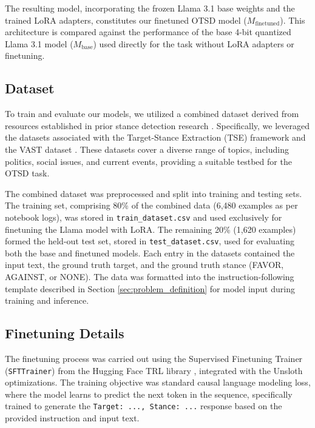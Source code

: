 \documentclass[twocolumn, 11pt,letterpaper]{article}
\begin{document}
The resulting model, incorporating the frozen Llama 3.1 base weights and the trained LoRA adapters, constitutes our finetuned OTSD model ($M_{\text{finetuned}}$). This architecture is compared against the performance of the base 4-bit quantized Llama 3.1 model ($M_{\text{base}}$) used directly for the task without LoRA adapters or finetuning.

\subsection{Dataset}
\label{sec:dataset}

To train and evaluate our models, we utilized a combined dataset derived from resources established in prior stance detection research \cite{akash2024}. Specifically, we leveraged the datasets associated with the Target-Stance Extraction (TSE) framework \cite{tse} and the VAST dataset \cite{vast}. These datasets cover a diverse range of topics, including politics, social issues, and current events, providing a suitable testbed for the OTSD task.

The combined dataset was preprocessed and split into training and testing sets. The training set, comprising 80\% of the combined data (6,480 examples as per notebook logs), was stored in \texttt{train\_dataset.csv} and used exclusively for finetuning the Llama model with LoRA. The remaining 20\% (1,620 examples) formed the held-out test set, stored in \texttt{test\_dataset.csv}, used for evaluating both the base and finetuned models. Each entry in the datasets contained the input text, the ground truth target, and the ground truth stance (FAVOR, AGAINST, or NONE). The data was formatted into the instruction-following template described in Section \ref{sec:problem_definition} for model input during training and inference.

\subsection{Finetuning Details}
\label{sec:finetuning}

The finetuning process was carried out using the Supervised Finetuning Trainer (\texttt{SFTTrainer}) from the Hugging Face TRL library \cite{trl}, integrated with the Unsloth optimizations. The training objective was standard causal language modeling loss, where the model learns to predict the next token in the sequence, specifically trained to generate the \texttt{Target: ..., Stance: ...} response based on the provided instruction and input text.
\end{document}
